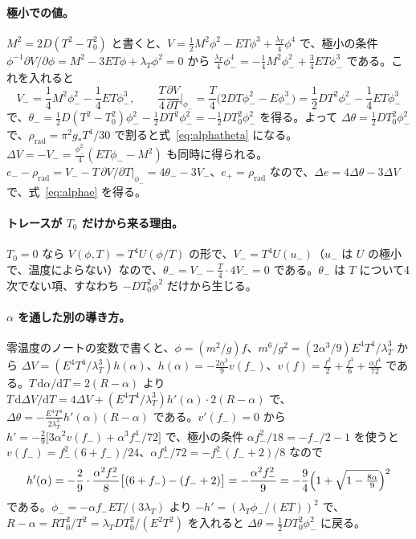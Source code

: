 \documentclass[a4paper,10pt]{ltjsarticle}
\newcommand{\dd}{\mathrm{d}}
\begin{document}
\paragraph{極小での値。}$M^2=2D(T^2-T_0^2)$ と書くと、$V=\frac12M^2\phi^2-ET\phi^3+\frac{\lambda_T}4\phi^4$ で、極小の条件 $\phi^{-1}\partial V/\partial\phi=M^2-3ET\phi+\lambda_T\phi^2=0$ から $\frac{\lambda_T}4\phi_-^4=-\frac14M^2\phi_-^2+\frac34ET\phi_-^3$ である。これを入れると
\begin{equation*}
V_-=\frac14M^2\phi_-^2-\frac14ET\phi_-^3,\qquad
\frac T4\frac{\partial V}{\partial T}\Big|_{\phi_-}=\frac T4\bigl(2DT\phi_-^2-E\phi_-^3\bigr)=\frac12DT^2\phi_-^2-\frac14ET\phi_-^3
\end{equation*}
で、$\theta_-=\frac12D(T^2-T_0^2)\phi_-^2-\frac12DT^2\phi_-^2=-\frac12DT_0^2\phi_-^2$ を得る。よって $\Delta\theta=\frac12DT_0^2\phi_-^2$ で、$\rho_{\mathrm{rad}}=\pi^2g_*T^4/30$ で割ると式~\eqref{eq:alphatheta} になる。$\Delta V=-V_-=\frac{\phi_-^2}4(ET\phi_--M^2)$ も同時に得られる。$e_--\rho_{\mathrm{rad}}=V_--T\,\partial V/\partial T|_{\phi_-}=4\theta_--3V_-$、$e_+=\rho_{\mathrm{rad}}$ なので、$\Delta e=4\Delta\theta-3\Delta V$ で、式~\eqref{eq:alphae} を得る。

\paragraph{トレースが $T_0$ だけから来る理由。}$T_0=0$ なら $V(\phi,T)=T^4U(\phi/T)$ の形で、$V_-=T^4U(u_-)$（$u_-$ は $U$ の極小で、温度によらない）なので、$\theta_-=V_--\frac T4\cdot4V_-=0$ である。$\theta_-$ は $T$ について4次でない項、すなわち $-DT_0^2\phi^2$ だけから生じる。

\paragraph{$\alpha$ を通した別の導き方。}零温度のノートの変数で書くと、$\phi=(m^2/g)f$、$m^6/g^2=(2\alpha^3/9)E^4T^4/\lambda_T^3$ から $\Delta V=(E^4T^4/\lambda_T^3)h(\alpha)$、$h(\alpha)=-\frac{2\alpha^3}{9}v(f_-)$、$v(f)=\frac{f^2}2+\frac{f^3}6+\frac{\alpha f^4}{72}$ である。$T\,\dd\alpha/\dd T=2(R-\alpha)$ より $T\,\dd\Delta V/\dd T=4\Delta V+(E^4T^4/\lambda_T^3)h'(\alpha)\cdot2(R-\alpha)$ で、$\Delta\theta=-\frac{E^4T^4}{2\lambda_T^3}h'(\alpha)(R-\alpha)$ である。$v'(f_-)=0$ から $h'=-\frac29\bigl[3\alpha^2v(f_-)+\alpha^3f_-^4/72\bigr]$ で、極小の条件 $\alpha f_-^2/18=-f_-/2-1$ を使うと $v(f_-)=f_-^2(6+f_-)/24$、$\alpha f_-^4/72=-f_-^2(f_-+2)/8$ なので
\begin{equation*}
h'(\alpha)=-\frac29\cdot\frac{\alpha^2f_-^2}{8}\bigl[(6+f_-)-(f_-+2)\bigr]=-\frac{\alpha^2f_-^2}{9}=-\frac94\Bigl(1+\sqrt{1-\tfrac{8\alpha}9}\Bigr)^2
\end{equation*}
である。$\phi_-=-\alpha f_-ET/(3\lambda_T)$ より $-h'=(\lambda_T\phi_-/(ET))^2$ で、$R-\alpha=RT_0^2/T^2=\lambda_TDT_0^2/(E^2T^2)$ を入れると $\Delta\theta=\frac12DT_0^2\phi_-^2$ に戻る。
\end{document}
